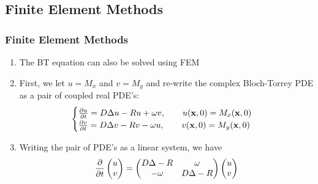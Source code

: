 \subsection{Finite Element Methods}

\begin{frame}
\frametitle{Finite Element Methods}
\begin{enumerate}
    \item The BT equation can also be solved using FEM
    \item First, we let $u=M_x$ and $v=M_y$ and re-write the complex Bloch-Torrey PDE as a pair of coupled real PDE's:
    \begin{equation*}
    \begin{cases}
        \frac{\partial u}{\partial t} = D \mbox{$\Delta$}{u} - R u + \omega v, \qquad u(\mathbf{x},0) = M_x(\mathbf{x},0) \\
        \frac{\partial v}{\partial t} = D \mbox{$\Delta$}{v} - R v - \omega u, \qquad v(\mathbf{x},0) = M_y(\mathbf{x},0)
    \end{cases}
    \end{equation*}
    \item Writing the pair of PDE's as a linear system, we have
    \begin{align*}
    \frac{\partial }{\partial t}
    \begin{pmatrix} u \\ v \end{pmatrix}
    = \begin{pmatrix}
    D \mbox{$\Delta$}{} - R & \omega \\ 
    -\omega & D \mbox{$\Delta$}{} - R
    \end{pmatrix}
    \begin{pmatrix} u \\ v \end{pmatrix}
    \end{align*}
\end{enumerate}
\end{frame}

